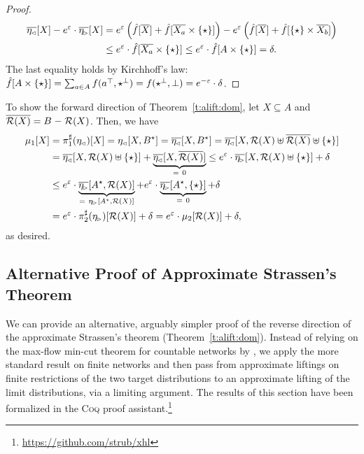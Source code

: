 \documentclass{lmcs}
\begin{document}
\begin{proof}
\begin{align*}
  \overline{\eta_{\mspace{-1.5mu}{\scriptscriptstyle \vartriangleleft}}}[X] - e^{\varepsilon} \cdot \overline{\eta_{\mspace{-1.5mu}{\scriptscriptstyle \vartriangleright}}}[X]
  &= e^{\varepsilon} \left(\hat{f}[\overline{X}] 
     + \hat{f}[\overline{X_a} \times \{\star\}]\right)
     - e^{\varepsilon} \left(\hat{f}[\overline{X}] 
     + \hat{f}[\{\star\} \times \overline{X_b}]\right)\\
  &\leq e^{\varepsilon} \cdot \hat{f}[\overline{X_a} \times \{\star\}]
  \leq e^{\varepsilon} \cdot \hat{f}[A \times \{\star\}]
   = \delta.
  \end{align*}
  \endgroup
  The last equality holds by Kirchhoff's law:
  $\hat{f}[A \times \{\star\}]
   = \sum_{a \in A} f({a^{\mathop{\top}}},{\star^{\mathop{\perp}}})
   = f({\star^{\mathop{\perp}}}, \mathop{\perp})
   = e^{-\varepsilon}\cdot\delta$.
\end{proof}

\xproofatend
  To show the forward direction of Theorem~\ref{t:alift:dom}, let $X \subseteq A$
  and $\overline{\mathcal{R}(X)} = B \mathrel{-} \mathcal{R}(X)$.
  Then, we have
  \begin{align*}
    \mu_1[X]
      &= \dfst(\eta\lside)[X]
       = \eta\lside[X, B^\star]
       = \overline{\eta\lside}[X, B^\star]
       = \overline{\eta\lside}
           [X, \oR(X) \uplus \rcomp{\oR(X)} \uplus \{ \star \}] \\
      &= \overline{\eta\lside}[X, \oR(X) \uplus \{ \star \}]
           + \underbrace{\overline{\eta\lside}[X, \rcomp{\oR(X)}]}_{=\ 0}
       \leq e^{\epsilon} \cdot \overline{\eta\rside}
          [X, \oR(X) \uplus \{ \star \}] + \delta \\
      &\leq
          e^{\epsilon} \cdot \underbrace{%
            \overline{\eta\rside}[A^\star, \oR(X)]}_{=\ \eta\rside[A^\star, \oR(X)]} +
          e^{\epsilon} \cdot \underbrace{%
            \overline{\eta\rside}[A^\star, \{ \star \}]}_{=\ 0} + \delta \\
      &= e^{\epsilon} \cdot \dsnd(\eta\rside)[\oR(X)] + \delta
       = e^{\epsilon} \cdot \mu_2[\oR(X)] + \delta ,
  \end{align*}
  as desired.
\xendproofatend

\subsection{Alternative Proof of Approximate Strassen's Theorem}

We can provide an alternative, arguably simpler proof of the reverse direction
of the approximate Strassen's theorem (Theorem~\ref{t:alift:dom}). Instead of
relying on the max-flow min-cut theorem for countable networks by
\citet{DBLP:journals/jct/AharoniBGPS11}, we apply the more standard result on
finite networks and then pass from approximate liftings on finite restrictions
of the two target distributions to an approximate lifting of the limit
distributions, via a limiting argument. The results of this section have been
formalized in the \textsc{Coq} proof
assistant.\footnote{\url{https://github.com/strub/xhl}}
\end{document}
